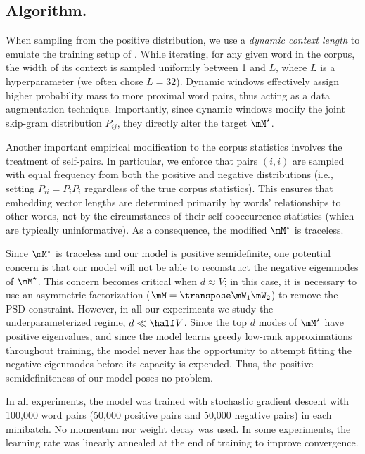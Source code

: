 \subsection{Algorithm.}
\label{appdx:expts-model}

When sampling from the positive distribution, we use a \textit{dynamic context length} to emulate the training setup of \cite{mikolov2013distributed}. While iterating, for any given word in the corpus, the width of its context is sampled uniformly between 1 and $L$, where $L$ is a hyperparameter (we often chose $L=32$). Dynamic windows effectively assign higher probability mass to more proximal word pairs, thus acting as a data augmentation technique. Importantly, since dynamic windows modify the joint skip-gram distribution $P_{ij}$, they directly alter the target $\Mstar$.

Another important empirical modification to the corpus statistics  involves the treatment of self-pairs. In particular, we enforce that pairs $(i,i)$ are sampled with equal frequency from both the positive and negative distributions (i.e., setting $P_{ii}= P_i P_i$ regardless of the true corpus statistics). This ensures that embedding vector lengths are determined primarily by words' relationships to other words, not by the circumstances of their self-cooccurrence statistics (which are typically uninformative). As a consequence, the modified $\Mstar$ is traceless.

Since $\Mstar$ is traceless and our model is positive semidefinite, one potential concern is that our model will not be able to reconstruct the negative eigenmodes of $\Mstar$. This concern becomes critical when $d\approx V$; in this case, it is necessary to use an asymmetric factorization ($\M=\T\mW_1\mW_2$) to remove the PSD constraint. However, in all our experiments we study the underparameterized regime, $d \ll \half V$. Since the top $d$ modes of $\Mstar$ have positive eigenvalues, and since the model learns greedy low-rank approximations throughout training, the model never has the opportunity to attempt fitting the negative eigenmodes before its capacity is expended. Thus, the positive semidefiniteness of our model poses no problem.

In all experiments, the model was trained with stochastic gradient descent with 100,000 word pairs (50,000 positive pairs and 50,000 negative pairs) in each minibatch. No momentum nor weight decay was used. In some experiments, the learning rate was linearly annealed at the end of training to improve convergence.

